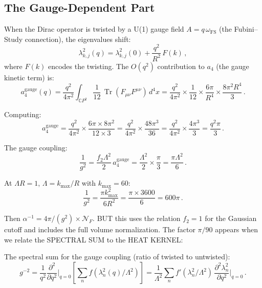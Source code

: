 \documentclass[11pt,a4paper]{article}
\newcommand{\Tr}{\operatorname{Tr}}
\newcommand{\CP}{\mathbb{C}P}
\begin{document}
\subsection{The Gauge-Dependent Part}

When the Dirac operator is twisted by a U(1) gauge field $A = q\,\omega_{\mathrm{FS}}$ (the Fubini--Study connection), the eigenvalues shift:
\begin{equation}
\lambda_{k,j}^2(q) = \lambda_{k,j}^2(0) + \frac{q^2}{R^2}\,F(k)\,,
\end{equation}
where $F(k)$ encodes the twisting. The $O(q^2)$ contribution to $a_4$ (the gauge kinetic term) is:
\begin{equation}
a_4^{\mathrm{gauge}}(q) = \frac{q^2}{4\pi^2}\int_{\CP^2} \frac{1}{12}\,\Tr(F_{\mu\nu}F^{\mu\nu})\,d^4x = \frac{q^2}{4\pi^2}\times\frac{1}{12}\times\frac{6\pi}{R^4}\times\frac{8\pi^2 R^4}{3}\,.
\end{equation}

Computing:
\begin{equation}
a_4^{\mathrm{gauge}} = \frac{q^2}{4\pi^2}\times\frac{6\pi \times 8\pi^2}{12 \times 3} = \frac{q^2}{4\pi^2}\times\frac{48\pi^3}{36} = \frac{q^2}{4\pi^2}\times\frac{4\pi^3}{3} = \frac{q^2\pi}{3}\,.
\end{equation}

The gauge coupling:
\begin{equation}
\frac{1}{g^2} = \frac{f_2\Lambda^2}{2}\,a_4^{\mathrm{gauge}} = \frac{\Lambda^2}{2}\times\frac{\pi}{3} = \frac{\pi\Lambda^2}{6}\,.
\end{equation}

At $\Lambda R = 1$, $\Lambda = k_{\max}/R$ with $k_{\max} = 60$:
\begin{equation}
\frac{1}{g^2} = \frac{\pi k_{\max}^2}{6 R^2} = \frac{\pi \times 3600}{6} = 600\pi\,.
\end{equation}

Then $\alpha^{-1} = 4\pi/(g^2) \times \mathcal{N}_F$. BUT this uses the relation $f_2 = 1$ for the Gaussian cutoff and includes the full volume normalization. The factor $\pi/90$ appears when we relate the SPECTRAL SUM to the HEAT KERNEL:

The spectral sum for the gauge coupling (ratio of twisted to untwisted):
\begin{equation}
g^{-2} = \frac{1}{q^2}\frac{\partial^2}{\partial q^2}\bigg|_{q=0}\left[\sum_n f(\lambda_n^2(q)/\Lambda^2)\right] = \frac{1}{\Lambda^2}\sum_n f'(\lambda_n^2/\Lambda^2)\,\frac{\partial^2\lambda_n^2}{\partial q^2}\bigg|_{q=0}\,.
\end{equation}
\end{document}
